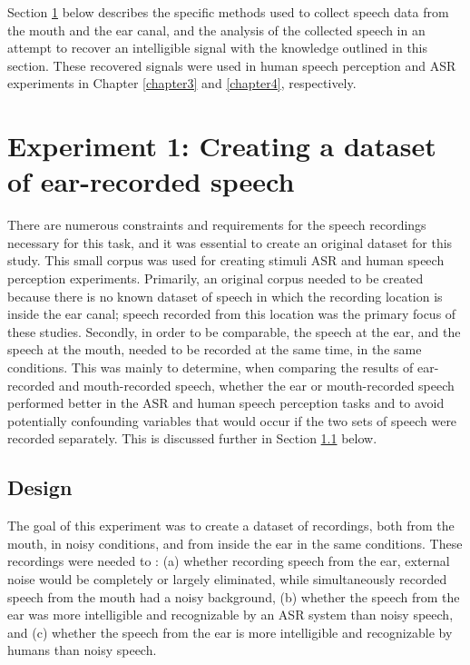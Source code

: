 Section \ref{expt1} below describes the specific methods used to collect speech data from the mouth and the ear canal, and the analysis of the collected speech in an attempt to recover an intelligible signal with the knowledge outlined in this section.  These recovered signals were used in human speech perception and ASR experiments in Chapter \ref{chapter3} and \ref{chapter4}, respectively.


\section{Experiment 1: Creating a dataset of ear-recorded speech}\label{expt1}

There are numerous constraints and requirements for the speech recordings necessary for this task, and it was essential to create an original dataset for this study.  This small corpus was used for creating stimuli ASR and human speech perception experiments.  Primarily, an original corpus needed to be created because there is no known dataset of speech in which the recording location is inside the ear canal; speech recorded from this location was the primary focus of these studies.  Secondly, in order to be comparable, the speech at the ear, and the speech at the mouth, needed to be recorded at the same time, in the same conditions.  This was mainly to determine, when comparing the results of ear-recorded and mouth-recorded speech, whether the ear or mouth-recorded speech performed better in the ASR and human speech perception tasks and to avoid potentially confounding variables that would occur if the two sets of speech were recorded separately. This is discussed further in Section \ref{chap2:methods:design} below.

\subsection{Design}
\label{chap2:methods:design}

The goal of this experiment was to create a dataset of recordings, both from the mouth, in noisy conditions, and from inside the ear in the same conditions.  These recordings were needed to \DIFdelbegin {}\DIFdelend \DIFaddbegin {}\DIFaddend : (a) whether recording speech from the ear, external noise would be completely or largely eliminated, while simultaneously recorded speech from the mouth had a noisy background, (b) whether the speech from the ear was more intelligible and recognizable by an ASR system than noisy speech, and (c) whether the speech from the ear is more intelligible and recognizable by humans than noisy speech. 

